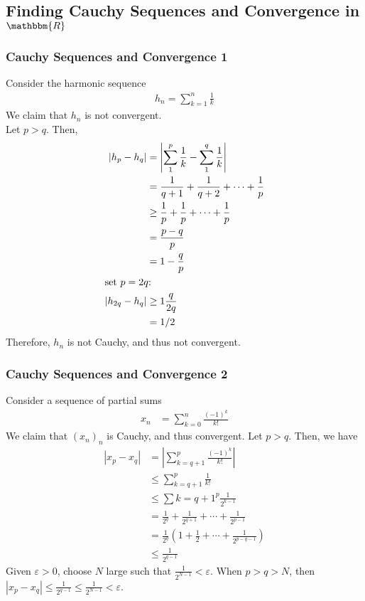 \documentclass[10pt]{extarticle}
\newcommand{\R}{\mathbbm{R}}
\begin{document}
  \subsection{Finding Cauchy Sequences and Convergence in $\R$}%
  \subsubsection{Cauchy Sequences and Convergence 1}%
   Consider the harmonic sequence
    \begin{align*}
      h_n = \sum_{k=1}^{n}\frac{1}{k}
    \end{align*}
    We claim that $h_n$ is not convergent.\\

    Let $p > q$. Then,
    \begin{align*}
      \left|h_p-h_q\right| &= \left|\sum_{1}^{p}\frac{1}{k} - \sum_{1}^{q}\frac{1}{k}\right|\\
                           &= \frac{1}{q+1} + \frac{1}{q+2} + \cdots + \frac{1}{p}\\
                           &\geq \frac{1}{p} + \frac{1}{p} + \cdots + \frac{1}{p}\\
                           &= \frac{p-q}{p} \\
                           &= 1-\frac{q}{p}\\
                           \shortintertext{set $p = 2q$:}
      \left|h_{2q}-h_q\right| &\geq 1\frac{q}{2q}\\
                              &= 1/2
    \end{align*}
    Therefore, $h_n$ is not Cauchy, and thus not convergent.\\
  \subsubsection{Cauchy Sequences and Convergence 2}%
    Consider a sequence of partial sums
    \begin{align*}
      x_n &= \sum_{k=0}^{n} \frac{(-1)^k}{k!}
    \end{align*}
    We claim that $(x_n)_n$ is Cauchy, and thus convergent. Let $p > q$. Then, we have
    \begin{align*}
      \left|x_p-x_q\right| &= \left|\sum_{k=q+1}^{p}\frac{(-1)^k}{k!}\right|\\
                           &\leq \sum_{k=q+1}^{p}\frac{1}{k!}\\
                           &\leq \sum{k=q+1}^{p}\frac{1}{2^{k-1}}\\
                           &= \frac{1}{2^q} + \frac{1}{2^{q+1}} + \cdots + \frac{1}{2^{p-1}}\\
                           &= \frac{1}{2^q}\left(1 + \frac{1}{2} + \cdots + \frac{1}{2^{p-q-1}}\right)\\
                           &\leq \frac{1}{2^{q-1}}
    \end{align*}
    Given $\varepsilon > 0$, choose $N$ large such that $\displaystyle \frac{1}{2^{N-1}} < \varepsilon$. When $p > q > N$, then $\displaystyle|x_p-x_q| \leq \frac{1}{2^{q-1}} \leq \frac{1}{2^{N-1}} < \varepsilon$.\\
\end{document}
